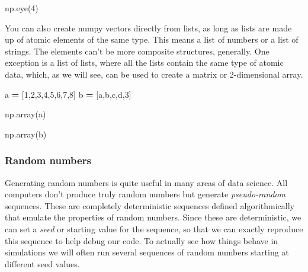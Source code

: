 \documentclass[
  letterpaper,
]{scrbook}
\newenvironment{Shaded}{\begin{snugshade}}{\end{snugshade}}
\newcommand{\DecValTok}[1]{\textcolor[rgb]{0.00,0.00,0.81}{#1}}
\newcommand{\NormalTok}[1]{#1}
\newcommand{\OperatorTok}[1]{\textcolor[rgb]{0.81,0.36,0.00}{\textbf{#1}}}
\newcommand{\StringTok}[1]{\textcolor[rgb]{0.31,0.60,0.02}{#1}}
\begin{document}
\begin{Shaded}
\begin{Highlighting}[]
\NormalTok{np.eye(}\DecValTok{4}\NormalTok{)}
\end{Highlighting}
\end{Shaded}

You can also create numpy vectors directly from lists, as long as lists are made up of atomic elements of the same type. This means a list of numbers or a list of strings. The elements can't be more composite structures, generally. One exception is a list of lists, where all the lists contain the same type of atomic data, which, as we will see, can be used to create a matrix or 2-dimensional array.

\begin{Shaded}
\begin{Highlighting}[]
\NormalTok{a }\OperatorTok{=}\NormalTok{ [}\DecValTok{1}\NormalTok{,}\DecValTok{2}\NormalTok{,}\DecValTok{3}\NormalTok{,}\DecValTok{4}\NormalTok{,}\DecValTok{5}\NormalTok{,}\DecValTok{6}\NormalTok{,}\DecValTok{7}\NormalTok{,}\DecValTok{8}\NormalTok{]}
\NormalTok{b }\OperatorTok{=}\NormalTok{ [}\StringTok{\textquotesingle{}a\textquotesingle{}}\NormalTok{,}\StringTok{\textquotesingle{}b\textquotesingle{}}\NormalTok{,}\StringTok{\textquotesingle{}c\textquotesingle{}}\NormalTok{,}\StringTok{\textquotesingle{}d\textquotesingle{}}\NormalTok{,}\StringTok{\textquotesingle{}3\textquotesingle{}}\NormalTok{]}

\NormalTok{np.array(a)}
\end{Highlighting}
\end{Shaded}

\begin{Shaded}
\begin{Highlighting}[]
\NormalTok{np.array(b)}
\end{Highlighting}
\end{Shaded}

\hypertarget{random-numbers}{%
\subsubsection{Random numbers}\label{random-numbers}}

Generating random numbers is quite useful in many areas of data science. All computers don't produce truly random numbers but generate \emph{pseudo-random} sequences. These are completely deterministic sequences defined algorithmically that emulate the properties of random numbers. Since these are deterministic, we can set a \emph{seed} or starting value for the sequence, so that we can exactly reproduce this sequence to help debug our code. To actually see how things behave in simulations we will often run several sequences of random numbers starting at different seed values.
\end{document}
